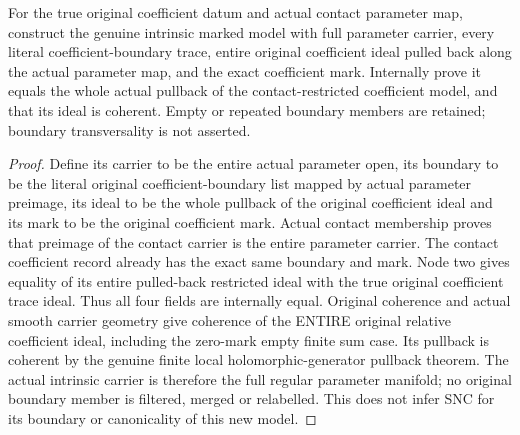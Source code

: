 \begin{theorem}
\label{hir:submersion-contact-param-coeff-intrinsic-whole-model}
\leanok
For the true original coefficient datum and actual contact parameter map,
construct the genuine intrinsic marked model with full parameter carrier,
every literal coefficient-boundary trace, entire original coefficient ideal
pulled back along the actual parameter map, and the exact coefficient mark.
Internally prove it equals the whole actual pullback of the contact-restricted
coefficient model, and that its ideal is coherent. Empty or repeated boundary
members are retained; boundary transversality is not asserted.
\end{theorem}
\begin{proof}
Define its carrier to be the entire actual parameter open, its boundary to be
the literal original coefficient-boundary list mapped by actual parameter
preimage, its ideal to be the whole pullback of the original coefficient
ideal and its mark to be the original coefficient mark. Actual contact
membership proves that preimage of the contact carrier is the entire
parameter carrier. The contact coefficient record already has the exact
same boundary and mark. Node two gives equality of its entire pulled-back
restricted ideal with the true original coefficient trace ideal. Thus all
four fields are internally equal. Original coherence and actual smooth
carrier geometry give coherence of the ENTIRE original relative coefficient
ideal, including the zero-mark empty finite sum case. Its pullback is coherent
by the genuine finite local holomorphic-generator pullback theorem. The
actual intrinsic carrier is therefore the full regular parameter manifold;
no original boundary member is filtered, merged or relabelled. This does not
infer SNC for its boundary or canonicality of this new model.
\end{proof}

